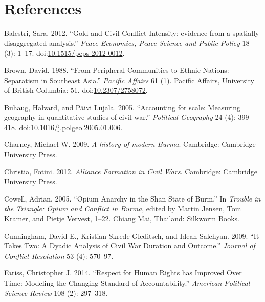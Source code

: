 \documentclass[12pt,]{book}
\theoremstyle{definition}
\theoremstyle{definition}
\theoremstyle{remark}
\begin{document}
\chapter*{References}\label{references}


\indent

\setlength{\parindent}{-0.2in} \setlength{\leftskip}{0.2in}
\setlength{\parskip}{8pt}

\singlespacing

\hypertarget{refs}{}
\hypertarget{ref-Balestri2012}{}
Balestri, Sara. 2012. ``Gold and Civil Conflict Intensity: evidence from
a spatially disaggregated analysis.'' \emph{Peace Economics, Peace
Science and Public Policy} 18 (3): 1--17.
doi:\href{https://doi.org/10.1515/peps-2012-0012}{10.1515/peps-2012-0012}.

\hypertarget{ref-Brown1988a}{}
Brown, David. 1988. ``From Peripheral Communities to Ethnic Nations:
Separatism in Southeast Asia.'' \emph{Pacific Affairs} 61 (1). Pacific
Affairs, University of British Columbia: 51.
doi:\href{https://doi.org/10.2307/2758072}{10.2307/2758072}.

\hypertarget{ref-Buhaug2005}{}
Buhaug, Halvard, and Päivi Lujala. 2005. ``Accounting for scale:
Measuring geography in quantitative studies of civil war.''
\emph{Political Geography} 24 (4): 399--418.
doi:\href{https://doi.org/10.1016/j.polgeo.2005.01.006}{10.1016/j.polgeo.2005.01.006}.

\hypertarget{ref-Charney2009}{}
Charney, Michael W. 2009. \emph{A history of modern Burma}. Cambridge:
Cambridge University Press.

\hypertarget{ref-Christia2012}{}
Christia, Fotini. 2012. \emph{Alliance Formation in Civil Wars}.
Cambridge: Cambridge University Press.

\hypertarget{ref-Cowell2005}{}
Cowell, Adrian. 2005. ``Opium Anarchy in the Shan State of Burm.'' In
\emph{Trouble in the Triangle: Opium and Conflict in Burma}, edited by
Martin Jensen, Tom Kramer, and Pietje Vervest, 1--22. Chiang Mai,
Thailand: Silkworm Books.

\hypertarget{ref-Cunningham2009}{}
Cunningham, David E., Kristian Skrede Gleditsch, and Idean Salehyan.
2009. ``It Takes Two: A Dyadic Analysis of Civil War Duration and
Outcome.'' \emph{Journal of Conflict Resolution} 53 (4): 570--97.

\hypertarget{ref-Fariss2014}{}
Fariss, Christopher J. 2014. ``Respect for Human Rights has Improved
Over Time: Modeling the Changing Standard of Accountability.''
\emph{American Political Science Review} 108 (2): 297--318.
\end{document}
